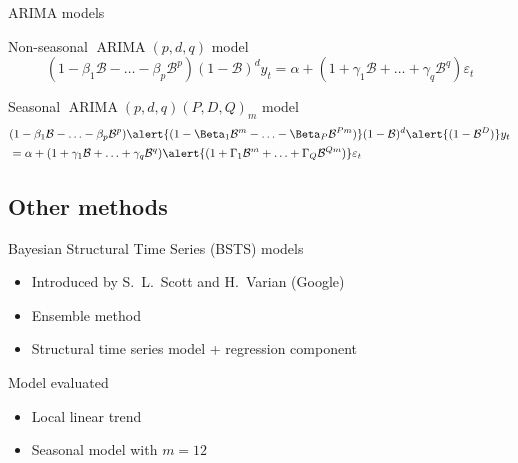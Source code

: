 \documentclass[12pt,aspectratio=169]{beamer}
\newcommand{\bshift}{\ensuremath{\mathcal{B}}}
\begin{document}
\begin{frame}{ARIMA models}
    \begin{block}{Non\hyp{}seasonal $\operatorname{ARIMA}(p, d, q)$ model}
        \[
            (1 - \beta_{1} \bshift - \ldots - \beta_{p} \bshift^{p}) (1 - \bshift)^{d} y_{t} = \alpha + (1 + \gamma_{1} \bshift + \ldots + \gamma_{q} \bshift^{q}) \varepsilon_{t}
        \]
    \end{block}
    \vfill\pause
    \begin{block}{Seasonal $\operatorname{ARIMA}(p, d, q)(P, D, Q)_{m}$ model}
        \vspace{-1em}
        \begin{align*}
            &(1 - \beta_{1} \bshift - \ldots - \beta_{p} \bshift^{p}) \alert{(1 - \Beta_{1} \bshift^{m} - \ldots - \Beta_{P} \bshift^{P m})} (1 - \bshift)^{d} \alert{(1 - \bshift^{D})} y_{t} \\
            &= \alpha + (1 + \gamma_{1} \bshift + \ldots + \gamma_{q} \bshift^{q}) \alert{(1 + \Gamma_{1} \bshift^{m} + \ldots + \Gamma_{Q} \bshift^{Q m})} \varepsilon_{t}
        \end{align*}
    \end{block}
\end{frame}

\subsection{Other methods}

\begin{frame}{Bayesian Structural Time Series (BSTS) models}
    \begin{itemize}
        \item Introduced by S.\ L.\ Scott and H.\ Varian (Google)
        \item Ensemble method
        \item Structural time series model + regression component
    \end{itemize}
    \vfill
    \begin{block}{Model evaluated}
        \begin{itemize}
            \item Local linear trend
            \item Seasonal model with $m = 12$
        \end{itemize}
    \end{block}
\end{frame}
\end{document}
